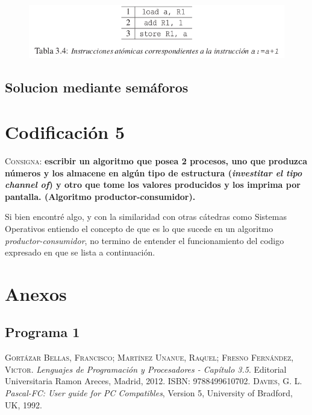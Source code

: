 \documentclass{article}
\begin{document}
\begin{figure}[H]
  \centering
  \includegraphics[width=.6\linewidth]{a+1.png}
  \caption{\cite{gortazarbellas}}
  \label{fig:asignacion}
\end{figure}

\newpage
\subsection{Solucion mediante sem\'aforos}



\section{Codificaci\'on 5}
\textsc{Consigna}: \textbf{escribir un algoritmo que posea 2 procesos, uno que produzca n\'umeros y los almacene en alg\'un tipo de estructura (\textit{investitar el tipo channel of}) y otro que tome los valores producidos y los imprima por pantalla. (Algoritmo productor-consumidor).}

Si bien encontr\'e algo, y con la similaridad con otras c\'atedras como Sistemas Operativos entiendo el concepto de que es lo que sucede en un algoritmo \textit{productor-consumidor}, no termino de entender el funcionamiento del codigo expresado en \cite{davies1992} que se lista a continuaci\'on.





\newpage
\section{Anexos}

\subsection{Programa 1}
\label{sub:a11}


\newpage
\begin{thebibliography}{99}
	\textsc{Gort\'azar Bellas, Francisco; Mart\'inez Unanue, Raquel; Fresno Fern\'andez, Victor}. \textit{Lenguajes de Programaci\'on y Procesadores - Cap\'itulo 3.5}. Editorial Universitaria Ramon Areces, Madrid, 2012. \textsc{ISBN: 9788499610702}.
	\textsc{Davies, G. L}. \textit{Pascal-FC: User guide for PC Compatibles}, Version 5, University of Bradford, UK, 1992.
\end{thebibliography}
\end{document}
